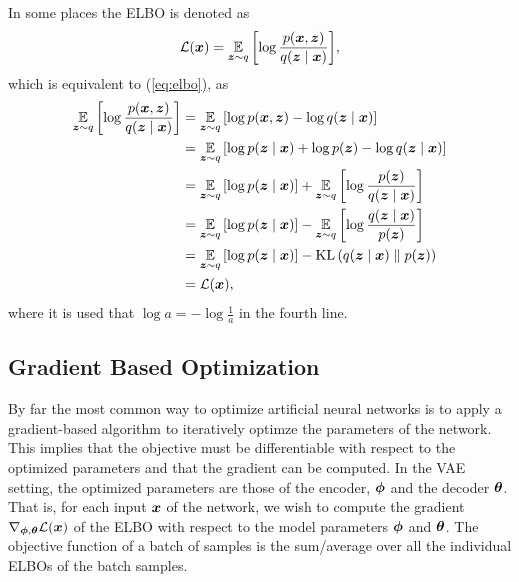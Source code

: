 In some places the ELBO is denoted as
\[ \mathcal{L}(\bm{ x }) = \operatorname*{\mathbb{E}}_{\bm{ z }\sim q}{\mathopen{} \left[ \log \frac{p(\bm{ x }, \bm{ z })}{q(\bm{ z } \mid \bm{ x })} \right] \mathclose{}},\]
which is equivalent to (\ref{eq:elbo}), as
\begin{align*}
    \operatorname*{\mathbb{E}}_{\bm{ z }\sim q}{\mathopen{} \left[ \log \frac{p(\bm{ x }, \bm{ z })}{q(\bm{ z } \mid \bm{ x })} \right] \mathclose{}} &= \operatorname*{\mathbb{E}}_{\bm{ z }\sim q}{\mathopen{} \left[ \log p(\bm{ x }, \bm{ z }) - \log q(\bm{ z } \mid \bm{ x }) \right] \mathclose{}}\\
    &= \operatorname*{\mathbb{E}}_{\bm{ z }\sim q}{\mathopen{} \left[ \log p(\bm{ z } \mid \bm{ x }) + \log p(\bm{ z }) - \log q(\bm{ z } \mid \bm{ x }) \right] \mathclose{}}\\
    &= \operatorname*{\mathbb{E}}_{\bm{ z }\sim q}{\mathopen{} \left[ \log p(\bm{ z } \mid \bm{ x }) \right] \mathclose{}} + \operatorname*{\mathbb{E}}_{\bm{ z }\sim q}{\mathopen{} \left[ \log \frac{p(\bm{ z })}{q(\bm{ z } \mid \bm{ x })} \right] \mathclose{}}\\
    &= \operatorname*{\mathbb{E}}_{\bm{ z }\sim q}{\mathopen{} \left[ \log p(\bm{ z } \mid \bm{ x }) \right] \mathclose{}} - \operatorname*{\mathbb{E}}_{\bm{ z }\sim q}{\mathopen{} \left[ \log \frac{q(\bm{ z } \mid \bm{ x })}{p(\bm{ z })} \right] \mathclose{}}\\
    &= \operatorname*{\mathbb{E}}_{\bm{ z }\sim q}{\mathopen{} \left[ \log p(\bm{ z } \mid \bm{ x }) \right] \mathclose{}} - \operatorname{KL}{\mathopen{} \left(q(\bm{ z } \mid \bm{ x }) \parallel p(\bm{ z })\right) \mathclose{}}\\
    &= \mathcal{L}(\bm{ x }),
\end{align*}
where it is used that $\log a = - \log \frac{1}{a}$ in the fourth line.

\subsection{Gradient Based Optimization}
\label{seq:gradient_based)optimization}
By far the most common way to optimize artificial neural networks is to apply a gradient-based algorithm to iteratively optimze the parameters of the network. This implies that the objective must be differentiable with respect to the optimized parameters and that the gradient can be computed. In the VAE setting, the optimized parameters are those of the encoder, $\bm{ \phi }$ and the decoder $\bm{ \theta }$. That is, for each input $\bm{ x }$ of the network, we wish to compute the gradient $\nabla_{\bm{ \phi }, \bm{ \theta }} \mathcal{L}(\bm{ x })$ of the ELBO with respect to the model parameters $\bm{ \phi }$ and $\bm{ \theta }$. The objective function of a batch of samples is the sum/average over all the individual ELBOs of the batch samples.

